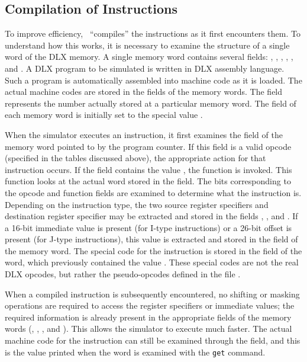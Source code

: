 \subsection{Compilation of Instructions}

To improve efficiency, \dlxsim\ ``compiles'' the instructions as it
first encounters them.  To understand how this works, it is necessary
to examine the structure of a single word of the DLX memory.  A single
memory word contains several fields: , ,
, , , and
.  A DLX program to be simulated is written in DLX
assembly language.  Such a program is automatically assembled into
machine code as it is loaded.  The actual machine codes are stored in
the  fields of the memory words.  The  field
represents the number actually stored at a particular memory word.
The  field of each memory word is initially set to the
special value .

When the simulator executes an instruction, it first examines the
 field of the memory word pointed to by the program counter.
If this field is a valid opcode (specified in the tables discussed
above), the appropriate action for that instruction occurs.  If the
 field contains the value , the
function  is invoked.  This function looks at the actual
word stored in the  field.  The bits corresponding to the
opcode and function fields are examined to determine what the
instruction is.  Depending on the instruction type, the two source
register specifiers and destination register specifier may be
extracted and stored in the fields , , and
.  If a 16-bit immediate value is present (for I-type
instructions) or a 26-bit offset is present (for J-type instructions),
this value is extracted and stored in the  field of the
memory word.  The special code for the instruction is stored in the
 field of the word, which previously contained the value
.  These special codes are not the real DLX
opcodes, but rather the pseudo-opcodes defined in the file
.

When a compiled instruction is subsequently encountered, no shifting
or masking operations are required to access the register specifiers or
immediate values; the required information is already present in the
appropriate fields of the memory words (, ,
, and ).  This allows the simulator to execute
much faster.  The actual machine code for the instruction can still be
examined through the  field, and this is the value printed
when the word is examined with the {\tt get} command.

